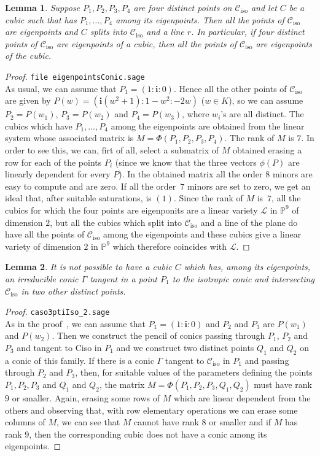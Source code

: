 \documentclass[11pt, a4paper, reqno, captions=tableheading,bibliography=totoc]{scrartcl}
\theoremstyle{plain}
\newtheorem{lemma}{Lemma}[section]
\theoremstyle{definition}
\newcommand{\iso}{\mathcal{C}_{\mathrm{iso}}}
\newcommand{\iii}{\textbf{i}}
\begin{document}
\begin{lemma}
\label{lemma:fourOnIso}
Suppose $P_1, P_2, P_3, P_4$ are four distinct points on $\iso$ and let 
$C$ be a cubic such that has $P_1, \dots, P_4$ among its eigenpoints.
Then all the points of $\iso$ are eigenpoints and $C$ splits into $\iso$
and a line $r$. In particular, if four
distinct points of $\iso$ are eigenpoints of a cubic, then all the
points of $\iso$ are eigenpoints of the cubic. 
\end{lemma}
\begin{proof}
\verb+file eigenpointsConic.sage+\\
As usual, we can assume that $P_1 = (1: \iii: 0)$. Hence all the other points
of $\iso$ are given by
$P(w) = (\iii(w^2 + 1): 1 - w^2: -2w)$ ($w\in K$), so we can assume
$P_2 = P(w_1)$, $P_3 = P(w_2)$ and $P_4 = P(w_3)$, where $w_i$'s are
all distinct. The cubics which have $P_1, \dots, P_4$ among the eigenpoints
are obtained from the linear system whose associated matrix is
$M = \Phi(P_1, P_2, P_3, P_4)$. The rank of $M$ is $7$. In order to see this,
we can, firt of all, select a submatrix of $M$ obtained erasing a
row for each of the points $P_i$ (since we know that the three vectors
$\phi(P)$ are linearly dependent for every $P$). In the obtained matrix
all the order $8$ minors are easy to compute and are zero.
If all the order~$7$
minors are set to zero, we get an ideal that, after suitable saturations,
is $(1)$. Since the rank of $M$ is~$7$, all the cubics for which the 
four points are eigenponits are a linear variety $\mathcal{L}$
in $\mathbb{P}^9$
of dimension $2$, but all the cubics which split into $\iso$ and a line
of the plane do have all the points of $\iso$ among the eigenpoints and
these cubics give a linear variety of dimension $2$ in $\mathbb{P}^9$
which therefore coincides with $\mathcal{L}$. 
\end{proof}

\begin{lemma}
\label{lemma3ptiSuCiso}
It is not possible to have a cubic $C$ which has, among its eigenpoints,
an irreducible conic $\Gamma$ tangent in a point $P_1$ to the isotropic
conic and intersecting $\iso$ in two other distinct points.
\end{lemma}
\begin{proof}
\verb+caso3ptiIso_2.sage+\\
As in the proof~, we can assume that
$P_1 = (1: \iii: 0)$
and $P_2$ and $P_3$ are $P(w_1)$ and $P(w_2)$. Then we construct
the pencil of conics passing through $P_1$, $P_2$ and $P_3$ and
tangent to Ciso in $P_1$ and we construct two distinct points
$Q_1$ and $Q_2$ on a conic of this family. If there is a conic $\Gamma$
tangent to $\iso$ in $P_1$ and passing through $P_2$ and $P_3$,
then, for suitable values of the parameters defining the points
$P_1, P_2, P_3$ and $Q_1$ and $Q_2$, the matrix
$M = \Phi(P_1, P_2, P_3, Q_1, Q_2)$
must have rank $9$ or smaller. Again, erasing some rows of $M$
which are linear dependent from the others and observing that,
with row elementary operations we can erase some columns of $M$,
we can see that $M$ cannot have rank $8$ or smaller and if $M$
has rank $9$, then the corresponding cubic does not have a conic
among its eigenpoints.
\end{proof}
\end{document}
